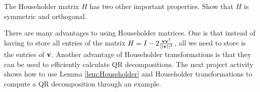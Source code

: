 \begin{pactivity}
\item The Householder matrix $H$ has two other important properties. Show that $H$ is symmetric and orthogonal. 

\begin{comment}

To see that $H$ is symmetric, note that 
\[H^{\tr} = \left(I - 2\vu \vu^{\tr}\right) = I^{\tr} - 2 \left(\vu \vu^{\tr}\right)^{\tr} = I - 2 \vu \vu^{\tr} = H.\]
Also,
\begin{align*}
HH^{\tr} &=  \left(I - 2\vu \vu^{\tr}\right) \left(I - 2\vu \vu^{\tr}\right) \\
	&= I - 4 \vu \vu^{\tr} + 4 \vu \vu^{\tr} \vu \vu^{\tr} \\
	&= I - 4 \vu \vu^{\tr} + 4 \vu \left(\vu^{\tr} \vu\right) \vu^{\tr} \\
	&= I - 4 \vu \vu^{\tr} + 4 \vu \left(||\vu||^2\right) \vu^{\tr} \\
	&= I - 4 \vu \vu^{\tr} + 4 \vu  \vu^{\tr} \\
	&= I,
\end{align*}
so $H^{\tr} = H^{-1}$ and $H$ is orthogonal. 

\end{comment}

\ea

\end{pactivity}

There are many advantages to using Householder matrices. One is that instead of having to store all entries of the matrix $H = I - 2 \frac{\mathbf{v} \mathbf{v}^{\mathsf{T}}}{||\mathbf{v}||^2}$, all we need to store is the entries of $\mathbf{v}$. Another advantage of Householder transformations is that they can be used to efficiently calculate QR decompositions. The next project activity shows how to use Lemma \ref{lem:Householder} and Householder transformations to compute a QR decomposition through an example. 

